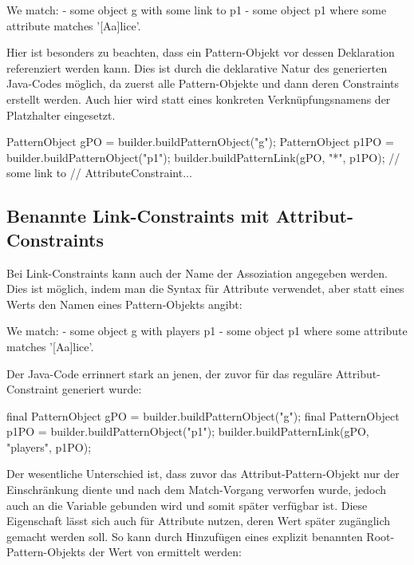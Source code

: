 \begin{mdcodeblock}
    We match:
    - some object g with some link to p1
    - some object p1 where some attribute matches '[Aa]lice'.
\end{mdcodeblock}

Hier ist besonders zu beachten, dass ein Pattern-Objekt vor dessen Deklaration referenziert werden kann.
Dies ist durch die deklarative Natur des generierten Java-Codes möglich, da zuerst alle Pattern-Objekte und dann deren Constraints erstellt werden.
Auch hier wird statt eines konkreten Verknüpfungsnamens der Platzhalter \code{*} eingesetzt.

\begin{jcodeblock}
    PatternObject gPO = builder.buildPatternObject("g");
    PatternObject p1PO = builder.buildPatternObject("p1");
    builder.buildPatternLink(gPO, "*", p1PO); // some link to
    // AttributeConstraint...
\end{jcodeblock}

\subsection{Benannte Link-Constraints mit Attribut-Constraints}

Bei Link-Constraints kann auch der Name der Assoziation angegeben werden.
Dies ist möglich, indem man die Syntax für Attribute verwendet, aber statt eines Werts den Namen eines Pattern-Objekts angibt:

\begin{mdcodeblock}
    We match:
    - some object g with players p1
    - some object p1 where some attribute matches '[Aa]lice'.
\end{mdcodeblock}

Der Java-Code errinnert stark an jenen, der zuvor für das reguläre Attribut-Constraint generiert wurde:

\begin{jcodeblock}
    final PatternObject gPO = builder.buildPatternObject("g");
    final PatternObject p1PO = builder.buildPatternObject("p1");
    builder.buildPatternLink(gPO, "players", p1PO);
\end{jcodeblock}

Der wesentliche Unterschied ist, dass zuvor das Attribut-Pattern-Objekt  nur der Einschränkung diente und nach dem Match-Vorgang verworfen wurde,  jedoch auch an die Variable  gebunden wird und somit später verfügbar ist.
Diese Eigenschaft lässt sich auch für Attribute nutzen, deren Wert später zugänglich gemacht werden soll.
So kann durch Hinzufügen eines explizit benannten Root-Pattern-Objekts der Wert von  ermittelt werden:

